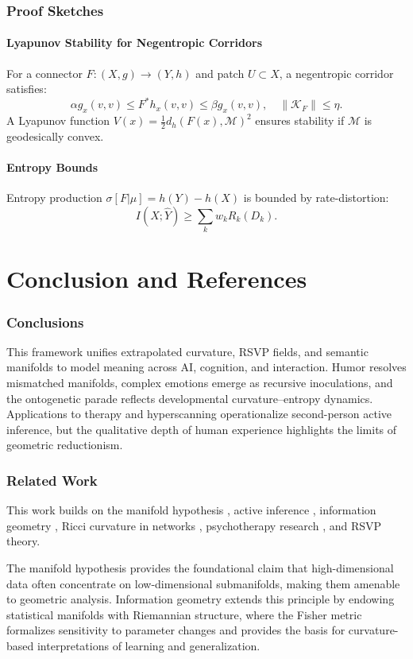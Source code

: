 \documentclass{article}
\theoremstyle{definition}
\begin{document}
\section{Proof Sketches}
\subsection{Lyapunov Stability for Negentropic Corridors}
For a connector $F: (X,g) \to (Y,h)$ and patch $U \subset X$, a negentropic corridor satisfies:
\[
\alpha g_x(v,v) \leq F^* h_x(v,v) \leq \beta g_x(v,v), \quad \|\mathcal{K}_F\| \leq \eta.
\]
A Lyapunov function $V(x) = \frac{1}{2} d_h(F(x), \mathcal{M})^2$ ensures stability if $\mathcal{M}$ is geodesically convex.

\subsection{Entropy Bounds}
Entropy production $\sigma[F|\mu] = h(Y) - h(X)$ is bounded by rate-distortion:
\[
I(X;\widehat{Y}) \geq \sum_k w_k R_k(D_k).
\]

\part{Conclusion and References}

\section{Conclusions}
This framework unifies extrapolated curvature, RSVP fields, and semantic manifolds to model meaning across AI, cognition, and interaction. Humor resolves mismatched manifolds, complex emotions emerge as recursive inoculations, and the ontogenetic parade reflects developmental curvature–entropy dynamics. Applications to therapy and hyperscanning operationalize second-person active inference, but the qualitative depth of human experience highlights the limits of geometric reductionism.
\section{Related Work}

This work builds on the manifold hypothesis \cite{fefferman2016testing}, active inference \cite{friston2017graphical}, information geometry \cite{caticha2015geometry}, Ricci curvature in networks \cite{forman2003bochner}, psychotherapy research \cite{adel2025systematic}, and RSVP theory. 

The manifold hypothesis provides the foundational claim that high-dimensional data often concentrate on low-dimensional submanifolds, making them amenable to geometric analysis. Information geometry extends this principle by endowing statistical manifolds with Riemannian structure, where the Fisher metric formalizes sensitivity to parameter changes and provides the basis for curvature-based interpretations of learning and generalization. 
\end{document}
